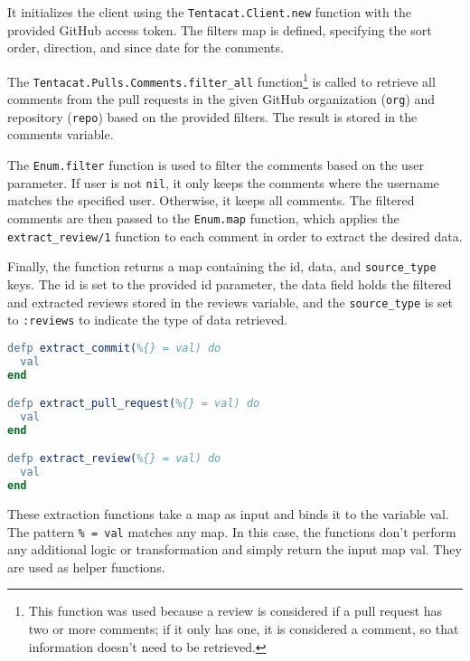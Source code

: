 It initializes the client using the \texttt{Tentacat.Client.new} function with the provided GitHub access token. The filters map is defined, specifying the sort order, direction, and since date for the comments.\newline

The \texttt{Tentacat.Pulls.Comments.filter\_all} function\footnote{This function was used because a review is considered if a pull request has two or more comments; if it only has one, it is considered a comment, so that information doesn't need to be retrieved.}\label{review} is called to retrieve all comments from the pull requests in the given GitHub organization (\texttt{org}) and repository (\texttt{repo}) based on the provided filters. The result is stored in the comments variable.\newline

The \texttt{Enum.filter} function is used to filter the comments based on the user parameter. If user is not \texttt{nil}, it only keeps the comments where the username matches the specified user. Otherwise, it keeps all comments. The filtered comments are then passed to the \texttt{Enum.map} function, which applies the \texttt{extract\_review/1} function to each comment in order to extract the desired data.\newline

Finally, the function returns a map containing the id, data, and \texttt{source\_type} keys. The id is set to the provided id parameter, the data field holds the filtered and extracted reviews stored in the reviews variable, and the \texttt{source\_type} is set to \texttt{:reviews} to indicate the type of data retrieved.\newline

\begin{lstlisting}[language=erlang, caption={Definition of private extraction functions of extractor\_github.ex}]
defp extract_commit(%{} = val) do
  val
end

defp extract_pull_request(%{} = val) do
  val
end

defp extract_review(%{} = val) do
  val
end
\end{lstlisting}

These extraction functions take a map as input and binds it to the variable val. The pattern \texttt{\%{} = val} matches any map. In this case, the functions don't perform any additional logic or transformation and simply return the input map val. They are used as helper functions.\newline

